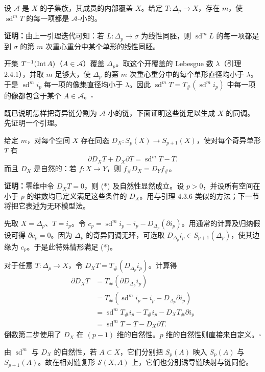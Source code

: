 设 $\mathcal A$ 是 $X$ 的子集族，其成员的内部覆盖 $X$。给定 $T:\Delta_p\to X$，存在 $m$，使 $\operatorname{sd}^mT$ 的每一项都是 $\mathcal A$-小的。

\textbf{证明：}由上一引理迭代可知：若 $L:\Delta_p\to\sigma$ 为线性同胚，则 $\operatorname{sd}^mL$ 的每一项都是到 $\sigma$ 的第 $m$ 次重心重分中某个单形的线性同胚。

开集 $T^{-1}(\operatorname{Int} A)$（$A\in\mathcal A$）覆盖 $\Delta_p$。取这个开覆盖的 Lebesgue 数 $\lambda$（引理 2.4.1），并取 $m$ 足够大，使 $\Delta_p$ 的第 $m$ 次重心重分中的每个单形直径均小于 $\lambda$。于是 $\operatorname{sd}^mi_p$ 每一项的像集直径均小于 $\lambda$。因此 $\operatorname{sd}^mT=T_\#(\operatorname{sd}^mi_p)$ 中每一项的像都包含于某个 $A\in\mathcal A$。\hfill$\square$

既已说明怎样把奇异链分割为 $\mathcal A$-小的链，下面证明这些链足以生成 $X$ 的同调。先证明一个引理。

给定 $m$，对每个空间 $X$ 存在同态 $D_X:S_p(X)\to S_{p+1}(X)$，使对每个奇异单形 $T$ 有
\[
\partial D_XT+D_X\partial T=\operatorname{sd}^mT-T.\tag{*}
\]
而且 $D_X$ 是自然的：若 $f:X\to Y$，则 $f_\#D_X=D_Yf_\#$。

\textbf{证明：}零维中令 $D_XT=0$，则 (*) 及自然性显然成立。设 $p>0$，并设所有空间在小于 $p$ 的维数均已定义满足这些条件的 $D_X$。用与引理 4.3.6 类似的方法；下一节将把它表述为无环模型法。

先取 $X=\Delta_p$、$T=i_p$。令 $c_p=\operatorname{sd}^mi_p-i_p-D_{\Delta_p}(\partial i_p)$。用通常的计算及归纳假设可得 $\partial c_p=0$。因为 $\Delta_p$ 的奇异同调无环，可选取 $D_{\Delta_p}i_p\in S_{p+1}(\Delta_p)$，使其边缘为 $c_p$。于是此特殊情形满足 (*)。

对于任意 $T:\Delta_p\to X$，令 $D_XT=T_\#(D_{\Delta_p}i_p)$。计算得
\begin{align*}
\partial D_XT&=T_\#(\partial D_{\Delta_p}i_p)\\
&=T_\#(\operatorname{sd}^mi_p-i_p-D_{\Delta_p}\partial i_p)\\
&=\operatorname{sd}^mT_\#i_p-T_\#i_p-D_XT_\#\partial i_p\\
&=\operatorname{sd}^mT-T-D_X\partial T.
\end{align*}
倒数第二步使用了 $D_X$ 在 $(p-1)$ 维的自然性。$p$ 维的自然性则直接来自定义。\hfill$\square$

由 $\operatorname{sd}^m$ 与 $D_X$ 的自然性，若 $A\subset X$，它们分别把 $S_p(A)$ 映入 $S_p(A)$ 与 $S_{p+1}(A)$。故在相对链复形 $\mathcal S(X,A)$ 上，它们也分别诱导链映射与链同伦。

